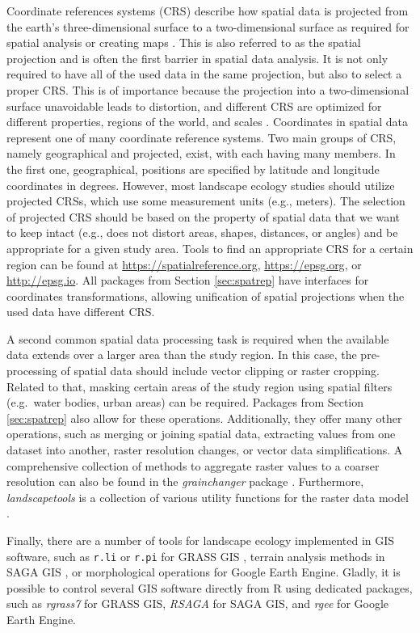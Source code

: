 \documentclass[smallextended]{svjour3}       %
\begin{document}
Coordinate references systems (CRS) describe how spatial data is projected from the earth's three-dimensional surface to a two-dimensional surface as required for spatial analysis or creating maps .
This is also referred to as the spatial projection and is often the first barrier in spatial data analysis.
It is not only required to have all of the used data in the same projection, but also to select a proper CRS.
This is of importance because the projection into a two-dimensional surface unavoidable leads to distortion, and different CRS are optimized for different properties, regions of the world, and scales .
Coordinates in spatial data represent one of many coordinate reference systems.
Two main groups of CRS, namely geographical and projected, exist, with each having many members.
In the first one, geographical, positions are specified by latitude and longitude coordinates in degrees.
However, most landscape ecology studies should utilize projected CRSs, which use some measurement units (e.g., meters).
The selection of projected CRS should be based on the property of spatial data that we want to keep intact (e.g., does not distort areas, shapes, distances, or angles) and be appropriate for a given study area.
Tools to find an appropriate CRS for a certain region can be found at \url{https://spatialreference.org}, \url{https://epsg.org}, or \url{http://epsg.io}.
All packages from Section \ref{sec:spatrep} have interfaces for coordinates transformations, allowing unification of spatial projections when the used data have different CRS.

A second common spatial data processing task is required when the available data extends over a larger area than the study region.
In this case, the pre-processing of spatial data should include vector clipping or raster cropping.
Related to that, masking certain areas of the study region using spatial filters (e.g.~water bodies, urban areas) can be required.
Packages from Section \ref{sec:spatrep} also allow for these operations.
Additionally, they offer many other operations, such as merging or joining spatial data, extracting values from one dataset into another, raster resolution changes, or vector data simplifications.
A comprehensive collection of methods to aggregate raster values to a coarser resolution can also be found in the \emph{grainchanger} package \cite{Graham2019}.
Furthermore, \emph{landscapetools} is a collection of various utility functions for the raster data model \cite{Sciaini2018}.

Finally, there are a number of tools for landscape ecology implemented in GIS software, such as \texttt{r.li} or \texttt{r.pi} for GRASS GIS \cite{wegmann2018r,neteler2012grass,Porta2017}, terrain analysis methods in SAGA GIS \cite{gmd-8-1991-2015}, or morphological operations for Google Earth Engine. Gladly, it is possible to control several GIS software directly from R using dedicated packages, such as \emph{rgrass7} \cite{R-grass7} for GRASS GIS, \emph{RSAGA} \cite{R-RSAGA} for SAGA GIS, and \emph{rgee} \cite{R-rgee} for Google Earth Engine.
\end{document}
